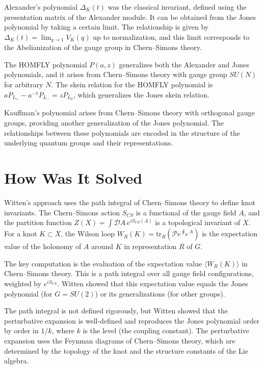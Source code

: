 Alexander's polynomial $\Delta_K(t)$ was the classical invariant, defined using the presentation matrix of the Alexander module. It can be obtained from the Jones polynomial by taking a certain limit. The relationship is given by $\Delta_K(t) = \lim_{q \to 1} V_K(q)$ up to normalization, and this limit corresponds to the Abelianization of the gauge group in Chern--Simons theory.

The HOMFLY polynomial $P(a, z)$ generalizes both the Alexander and Jones polynomials, and it arises from Chern--Simons theory with gauge group $SU(N)$ for arbitrary $N$. The skein relation for the HOMFLY polynomial is $a P_{L_+} - a^{-1} P_{L_-} = z P_{L_0}$, which generalizes the Jones skein relation.

Kauffman's polynomial arises from Chern--Simons theory with orthogonal gauge groups, providing another generalization of the Jones polynomial. The relationships between these polynomials are encoded in the structure of the underlying quantum groups and their representations.

\section{How Was It Solved}

Witten's approach uses the path integral of Chern--Simons theory to define knot invariants. The Chern--Simons action $S_{CS}$ is a functional of the gauge field $A$, and the partition function $Z(X) = \int \mathcal{D}A \, e^{iS_{CS}(A)}$ is a topological invariant of $X$. For a knot $K \subset X$, the Wilson loop $W_R(K) = \text{tr}_R(\mathcal{P}e^{\oint_K A})$ is the expectation value of the holonomy of $A$ around $K$ in representation $R$ of $G$.

The key computation is the evaluation of the expectation value $\langle W_R(K) \rangle$ in Chern--Simons theory. This is a path integral over all gauge field configurations, weighted by $e^{iS_{CS}}$. Witten showed that this expectation value equals the Jones polynomial (for $G = SU(2)$) or its generalizations (for other groups).

The path integral is not defined rigorously, but Witten showed that the perturbative expansion is well-defined and reproduces the Jones polynomial order by order in $1/k$, where $k$ is the level (the coupling constant). The perturbative expansion uses the Feynman diagrams of Chern--Simons theory, which are determined by the topology of the knot and the structure constants of the Lie algebra.

